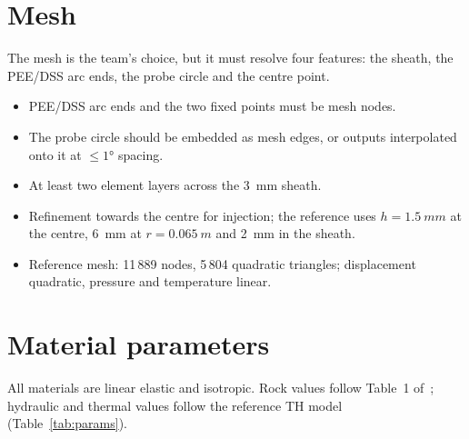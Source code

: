 \documentclass[11pt,a4paper]{article}
\begin{document}
\section{Mesh}
The mesh is the team's choice, but it must resolve four features: the sheath,
the PEE/DSS arc ends, the probe circle and the centre point.
\begin{itemize}
  \item PEE/DSS arc ends and the two fixed points must be mesh nodes.
  \item The probe circle should be embedded as mesh edges, or outputs
        interpolated onto it at $\le\ang{1}$ spacing.
  \item At least two element layers across the \SI{3}{mm} sheath.
  \item Refinement towards the centre for injection; the reference uses
        $h=\SI{1.5}{mm}$ at the centre, \SI{6}{mm} at $r=\SI{0.065}{m}$ and
        \SI{2}{mm} in the sheath.
  \item Reference mesh: 11\,889 nodes, 5\,804 quadratic triangles; displacement
        quadratic, pressure and temperature linear.
\end{itemize}

\section{Material parameters}
All materials are linear elastic and isotropic. Rock values follow Table~1
of~\cite{Mollaali2026}; hydraulic and thermal values follow the reference TH
model (Table~\ref{tab:params}).
\end{document}
